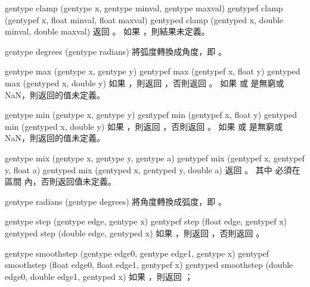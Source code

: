 gentype clamp (gentype x,
		gentype minval,
		gentype maxval)
gentypef clamp (gentypef x,
		float minval,
		float maxval)
gentyped clamp (gentyped x,
		double minval,
		double maxval)
\stopbuffer
{}
返回 。
如果 ，則結果未定義。
\stopbuffer

gentype degrees (gentype radians)
\stopbuffer
{}
將弧度轉換成角度，即 。
\stopbuffer

gentype max (gentype x, gentype y)
gentypef max (gentypef x, float y)
gentyped max (gentyped x, double y)
\stopbuffer
{}
如果 ，則返回 ，否則返回 。
如果  或  是無窮或 NaN，則返回的值未定義。
\stopbuffer

gentype min (gentype x, gentype y)
gentypef min (gentypef x, float y)
gentyped min (gentyped x, double y)
\stopbuffer
{}
如果 ，則返回 ，否則返回 。
如果  或  是無窮或 NaN，則返回的值未定義。
\stopbuffer

gentype mix (gentype x,
		gentype y,
		gentype a)
gentypef mix (gentypef x,
		gentypef y,
		float a)
gentyped mix (gentyped x,
		gentyped y,
		double a)
\stopbuffer
{}
返回 。
其中  必須在區間  內，否則返回值未定義。
\stopbuffer

gentype radians (gentype degrees)
\stopbuffer
{}
將角度轉換成弧度，即 。
\stopbuffer

gentype step (gentype edge,
		gentype x)
gentypef step (float edge,
		gentypef x)
gentyped step (double edge,
		gentyped x)
\stopbuffer
{}
如果 ，則返回 ，否則返回 。
\stopbuffer

gentype smoothstep (gentype edge0,
		gentype edge1,
		gentype x)
gentypef smoothstep (float edge0,
		float edge1,
		gentypef x)
gentyped smoothstep (double edge0,
		double edge1,
		gentyped x)
\stopbuffer
{}
如果 ，則返回 ；

